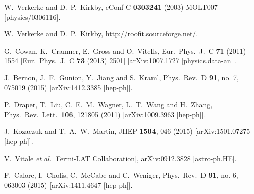 \documentclass[preprintnumbers,superscriptaddress,nofootinbib,aps,prd,floatfix]{revtex4}
\begin{document}
\begin{thebibliography}{99}
  W.~Verkerke and D.~P.~Kirkby,
  eConf C {\bf 0303241} (2003) MOLT007
  [physics/0306116].
  
  W.~Verkerke and D.~P.~Kirkby,
\url{http://roofit.sourceforge.net/}.
  
  G.~Cowan, K.~Cranmer, E.~Gross and O.~Vitells,
  Eur.\ Phys.\ J.\ C {\bf 71} (2011) 1554
   [Eur.\ Phys.\ J.\ C {\bf 73} (2013) 2501]
  [arXiv:1007.1727 [physics.data-an]].

  J.~Bernon, J.~F.~Gunion, Y.~Jiang and S.~Kraml,
  Phys.\ Rev.\ D {\bf 91}, no. 7, 075019 (2015)
  [arXiv:1412.3385 [hep-ph]].
 
  P.~Draper, T.~Liu, C.~E.~M.~Wagner, L.~T.~Wang and H.~Zhang,
  Phys.\ Rev.\ Lett.\  {\bf 106}, 121805 (2011)
  [arXiv:1009.3963 [hep-ph]].

  J.~Kozaczuk and T.~A.~W.~Martin,
  JHEP {\bf 1504}, 046 (2015)
  [arXiv:1501.07275 [hep-ph]].
 
  V.~Vitale {\it et al.} [Fermi-LAT Collaboration],
  arXiv:0912.3828 [astro-ph.HE].
 
  F.~Calore, I.~Cholis, C.~McCabe and C.~Weniger,
  Phys.\ Rev.\ D {\bf 91}, no. 6, 063003 (2015)
  [arXiv:1411.4647 [hep-ph]].
 

\end{thebibliography}
\end{document}
